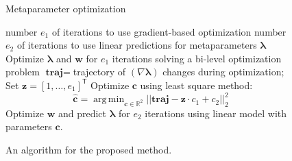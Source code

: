 \documentclass[runningheads]{llncs}
\DeclareMathOperator*{\argmin}{arg\,min}
\begin{document}
\begin{figure}
\begin{algorithm}[H]
\caption{Metaparameter optimization}
 \begin{algorithmic}[1]

 \REQUIRE number $e_1$ of iterations to use gradient-based optimization 
 \REQUIRE number $e_2$ of iterations to use linear predictions for metaparameters $\boldsymbol{\lambda}$  
  \STATE Optimize $\boldsymbol{\lambda}$ and $\mathbf{w}$ for $e_1$ iterations solving a bi-level optimization problem
  \STATE $\textbf{traj} = $trajectory of $(\nabla \boldsymbol{\lambda})$ changes during optimization;
  \STATE Set $\mathbf{z} = [1,\dots,e_1]^\mathsf{T}$
  \STATE Optimize $\mathbf{c}$ using least square method: 
  $$\hat{\mathbf{c}} = \argmin_{\mathbf{c} \in \mathbb{R}^2} ||\textbf{traj} - \mathbf{z}\cdot c_1 + c_2||_2^2$$
  \STATE Optimize $\mathbf{w}$ and predict $\boldsymbol{\lambda}$ for $e_2$ iterations using linear model with parameters $\mathbf{c}$.
  \ENDWHILE

 \end{algorithmic}
 \end{algorithm}
 \caption{An algorithm for the proposed method.}
 \label{algo}

 \end{figure}
 

\end{document}
